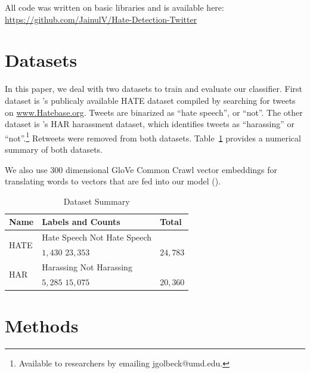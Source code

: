 \documentclass{article}
\begin{document}
  All code was written on basic libraries and is available here: \url{https://github.com/JainulV/Hate-Detection-Twitter}

  \section{Datasets}
  In this paper, we deal with two datasets to train and evaluate our classifier. First dataset
  is \citet{hateoffensive}'s publicaly available HATE dataset compiled by searching for tweets on \url{www.Hatebase.org}.
  Tweets are binarized as ``hate speech'', or ``not''.
  The other dataset is \cite{Golbeck:2017:LLC:3091478.3091509}'s HAR harassment dataset, which identifies
  tweets as ``harassing'' or ``not''.\footnote{Available to researchers
  by emailing jgolbeck@umd.edu.} Retweets were removed from both datasets. Table~\ref{datasets-table}
  provides a numerical summary of both datasets.

  We also use 300 dimensional GloVe Common Crawl vector embeddings for translating words to vectors that are fed into our model
  (\citet{pennington2014glove}).

  \begin{table}
    \caption{Dataset Summary}
    \label{datasets-table}
    \centering
    \begin{tabular}{lll}
      \toprule
      Name     & Labels and Counts     & Total \\
      \midrule
      \multirow{2}{*}{HATE} & Hate Speech \hspace{0.4cm} Not Hate Speech   &    \\
                             &  \hspace{0.2cm} \(1,430\) \hspace{2cm} \(23,353\) & $24,783$ \\
      \multirow{2}{*}{HAR} & Harassing \hspace{0.8cm} Not Harassing  &    \\
                             &  \hspace{0.2cm} $5,285$ \hspace{2cm} $15,075$ & $20,360$  \\
      \bottomrule
    \end{tabular}
  \end{table}

  \section{Methods}
\end{document}
